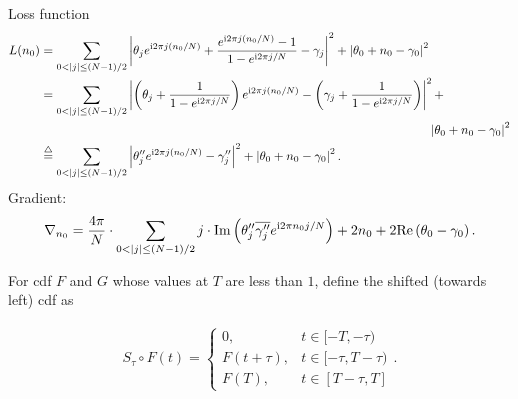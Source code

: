 \noindent
Loss function
\begin{equation*}
		\begin{aligned}\label{eq:aligned distance}
		L(n_0)&=
		\sum_{0<|j|\leq (N-1)/2}
		\left| \theta_{j}e^{\complexunit 2\pi j (n_0/N)}+
		\frac{e^{\complexunit{}2\pi j (n_0/N)}-1}{1-e^{\complexunit{}2\pi j /N}}
		-\gamma_{j} \right|^2
		+ \left| \theta_0+n_0-\gamma_0 \right|^2
		\\
		&=
		\sum_{0<|j|\leq (N-1)/2}
		\left| \left( \theta_{j}+ \frac{1}{1-e^{\complexunit{}2\pi j /N}} \right) e^{\complexunit{}2\pi j (n_0/N)} 
		- \left( \gamma_{j}+\frac{1}{1-e^{\complexunit{}2\pi j /N}} \right)  \right|^2 
		+\\
		&\hspace{11cm} \left| \theta_0+n_0-\gamma_0 \right|^2
		\\
		&\overset{\triangle}{=}
		\sum_{0<|j|\leq (N-1)/2}\left| \theta_{j}'' e^{\complexunit{}2\pi j (n_0/N)} - {\gamma_{j}''}  \right|^2
		+ \left| \theta_0+n_0-\gamma_0 \right|^2
		.
\end{aligned}
\end{equation*}
\noindent
Gradient:
	\begin{equation}
		\begin{split}
		\nabla_{n_0} = \frac{4\pi}{N}\cdot 
		\sum_{0<|j|\leq (N-1)/2} j\cdot 
		\text{Im} \left( {\theta_j''}\overline{{\gamma_j''}}e^{\complexunit2\pi n_0 j/N} \right) 
		+ 2n_0+2 \text{Re}\left( \theta_0-\gamma_0 \right) .
		\end{split}
		\end{equation}



For cdf $F$ and $G$ whose values at $T$ are less than $1$, define the shifted (towards left) cdf as


\begin{align}\label{eq:def of shifted curve}
	S_\tau\circ F(t)=
	\begin{cases}
	0, &t\in[-T,-\tau)\\
	F(t+ \tau), &t\in[-\tau,T-\tau)\\
	F(T),& t\in [T-\tau,T]
	\end{cases}.
\end{align}

